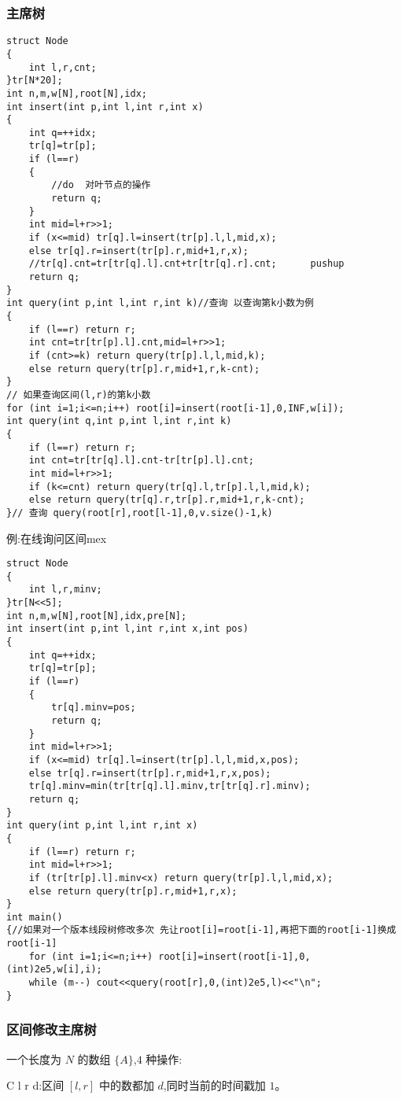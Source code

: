 \documentclass[a4paper]{ctexart}
\begin{document}
\subsubsection{主席树}
\begin{lstlisting}
struct Node
{
	int l,r,cnt;
}tr[N*20];
int n,m,w[N],root[N],idx;
int insert(int p,int l,int r,int x)
{
	int q=++idx;
	tr[q]=tr[p];
	if (l==r)
	{
		//do  对叶节点的操作
		return q;
	}
	int mid=l+r>>1;
	if (x<=mid) tr[q].l=insert(tr[p].l,l,mid,x);
	else tr[q].r=insert(tr[p].r,mid+1,r,x);
	//tr[q].cnt=tr[tr[q].l].cnt+tr[tr[q].r].cnt;      pushup
	return q;
}
int query(int p,int l,int r,int k)//查询 以查询第k小数为例
{
	if (l==r) return r;
	int cnt=tr[tr[p].l].cnt,mid=l+r>>1;
	if (cnt>=k) return query(tr[p].l,l,mid,k);
	else return query(tr[p].r,mid+1,r,k-cnt);
}
// 如果查询区间(l,r)的第k小数
for (int i=1;i<=n;i++) root[i]=insert(root[i-1],0,INF,w[i]);
int query(int q,int p,int l,int r,int k)
{
	if (l==r) return r;
	int cnt=tr[tr[q].l].cnt-tr[tr[p].l].cnt;
	int mid=l+r>>1;
	if (k<=cnt) return query(tr[q].l,tr[p].l,l,mid,k);
	else return query(tr[q].r,tr[p].r,mid+1,r,k-cnt);
}// 查询 query(root[r],root[l-1],0,v.size()-1,k)
\end{lstlisting}

例:在线询问区间mex
\begin{lstlisting}
struct Node
{
    int l,r,minv;
}tr[N<<5];
int n,m,w[N],root[N],idx,pre[N];
int insert(int p,int l,int r,int x,int pos)
{
    int q=++idx;
    tr[q]=tr[p];
    if (l==r)
    {
        tr[q].minv=pos;
        return q;
    }
    int mid=l+r>>1;
    if (x<=mid) tr[q].l=insert(tr[p].l,l,mid,x,pos);
    else tr[q].r=insert(tr[p].r,mid+1,r,x,pos);
    tr[q].minv=min(tr[tr[q].l].minv,tr[tr[q].r].minv);
    return q;
}
int query(int p,int l,int r,int x)
{
    if (l==r) return r;
    int mid=l+r>>1;
    if (tr[tr[p].l].minv<x) return query(tr[p].l,l,mid,x);
    else return query(tr[p].r,mid+1,r,x); 
}
int main()
{//如果对一个版本线段树修改多次 先让root[i]=root[i-1],再把下面的root[i-1]换成root[i-1]
    for (int i=1;i<=n;i++) root[i]=insert(root[i-1],0,(int)2e5,w[i],i);
    while (m--) cout<<query(root[r],0,(int)2e5,l)<<"\n";
}
\end{lstlisting}

\subsubsection{区间修改主席树}

一个长度为 $N$ 的数组 $\{A\}$,$4$ 种操作:

C l r d:区间 $[l,r]$ 中的数都加 $d$,同时当前的时间戳加 $1$。
\end{document}

